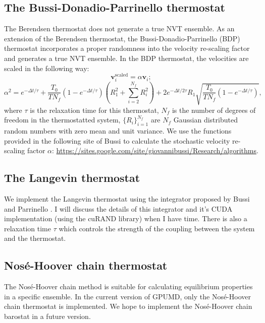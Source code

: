 \documentclass[12pt,a4paper]{report}
\newcommand{\vect}[1]{\boldsymbol{#1}}
\begin{document}
\subsection{The Bussi-Donadio-Parrinello thermostat}

The Berendsen thermostat does not generate a true NVT ensemble. As an extension of the Berendsen thermostat, the  Bussi-Donadio-Parrinello (BDP) thermostat \cite{bussi2007jcp} incorporates a proper randomness into the velocity re-scaling factor and generates a true NVT ensemble. In the BDP thermostat, the velocities are scaled in the following way: 
\begin{equation}
\vect{v}_i^{\text{scaled}}
=\alpha \vect{v}_i;
\end{equation}
\begin{equation}
\alpha^2=
e^{-\Delta t/\tau} + 
\frac{T_0}{TN_f} \left( 1-e^{-\Delta t/\tau} \right) \left( R_1^2 + \sum_{i=2}^{N_f}R_i^2 \right) +
2e^{-\Delta t/2\tau} R_1 \sqrt{\frac{T_0}{TN_f} \left( 1-e^{-\Delta t/\tau} \right) },
\end{equation}
where $\tau$ is the relaxation time for this thermostat, $N_f$ is the number of degrees of freedom in the thermostatted system, $\{R_i\}_{i=1}^{N_f}$ are $N_f$ Gaussian distributed random numbers with zero mean and unit variance. We use the functions provided in the following site of Bussi to calculate the stochastic velocity re-scaling factor $\alpha$: \url{https://sites.google.com/site/giovannibussi/Research/algorithms}.

\subsection{The Langevin thermostat}

We implement the Langevin thermostat using the integrator proposed by Bussi and Parrinello \cite{bussi2007pre}. I will discuss the details of this integrator and it's CUDA implementation (using the cuRAND library) when I have time. There is also a relaxation time $\tau$ which controls the strength of the coupling between the system and the thermostat. 

\subsection{Nos\'e-Hoover chain thermostat}

The Nos\'e-Hoover chain method \cite{nose1984jcp,hoover1985pra,martyna1992jcp,martyna1996mp,tuckerman2010} is suitable for calculating equilibrium properties in a specific ensemble. In the current version of GPUMD, only the Nos\'e-Hoover chain thermostat is implemented. We hope to implement the Nos\'e-Hoover chain barostat in a future version.
\end{document}
